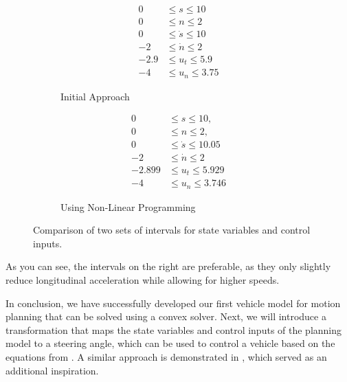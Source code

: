 \begin{figure}[h]
	\centering
	\begin{subfigure}[b]{0.45\textwidth}
		\centering
		\begin{align*}
			0    & \leq s \leq 10       \\
			0    & \leq n \leq 2        \\
			0    & \leq \dot{s} \leq 10 \\
			-2   & \leq \dot{n} \leq 2  \\
			-2.9 & \leq u_t \leq 5.9    \\
			-4   & \leq u_n \leq 3.75
		\end{align*}
		\caption{Initial Approach}
	\end{subfigure}
	\hfill
	\begin{subfigure}[b]{0.45\textwidth}
		\centering
		\begin{align*}
			0      & \leq s \leq 10,         \\
			0      & \leq n \leq 2,          \\
			0      & \leq \dot{s} \leq 10.05 \\
			-2     & \leq \dot{n} \leq 2     \\
			-2.899 & \leq u_t \leq 5.929     \\
			-4     & \leq u_n \leq 3.746
		\end{align*}
		\caption{Using Non-Linear Programming}
	\end{subfigure}
	\caption{Comparison of two sets of intervals for state variables and control inputs.}
\end{figure}

As you can see, the intervals on the right are preferable, as they only slightly reduce longitudinal acceleration while allowing for higher speeds.

In conclusion, we have successfully developed our first vehicle model for motion planning that can be solved using a convex solver.
Next, we will introduce a transformation that maps the state variables and control inputs of the planning model to a steering angle, which can be
used to control a vehicle based on the equations from \cite{eilbrecht_challenges_2020}.
A similar approach is demonstrated in \cite{werling_optimal_2010}, which served as an additional inspiration.

